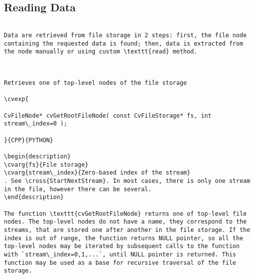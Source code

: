 \subsection{Reading Data}
\begin{verbatim}

Data are retrieved from file storage in 2 steps: first, the file node containing the requested data is found; then, data is extracted from the node manually or using custom \texttt{read} method.


\end{verbatim}
\begin{verbatim}

Retrieves one of top-level nodes of the file storage

\cvexp{

CvFileNode* cvGetRootFileNode( const CvFileStorage* fs, int stream\_index=0 );

}{CPP}{PYTHON}

\begin{description}
\cvarg{fs}{File storage}
\cvarg{stream\_index}{Zero-based index of the stream}
. See \cross{StartNextStream}. In most cases, there is only one stream in the file, however there can be several.
\end{description}

The function \texttt{cvGetRootFileNode} returns one of top-level file nodes. The top-level nodes do not have a name, they correspond to the streams, that are stored one after another in the file storage. If the index is out of range, the function returns NULL pointer, so all the top-level nodes may be iterated by subsequent calls to the function with `stream\_index=0,1,...`, until NULL pointer is returned. This function may be used as a base for recursive traversal of the file storage.


\end{verbatim}

